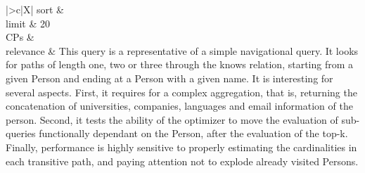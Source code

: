 \begin{tabularx}{\queryCardWidth}{|>{\queryPropertyCell}c|X|}
%
	sort		&
		\innerCardVSpace \\ \hline
	limit & 20 \\ \hline
	CPs &
	 \\ \hline
	relevance &
		\small This query is a representative of a simple navigational query. It looks for paths of length one, two or three through
the knows relation, starting from a given Person and ending at a Person with a given name. It is interesting for several
aspects. First, it requires for a complex aggregation, that is, returning the concatenation of universities, companies,
languages and email information of the person. Second, it tests the ability of the optimizer to move the evaluation of
sub-queries functionally dependant on the Person, after the evaluation of the top-k. Finally, performance is
highly sensitive to properly estimating the cardinalities in each transitive path, and paying attention not to explode
already visited Persons.
 \\ \hline%
\end{tabularx}
\queryCardVSpace